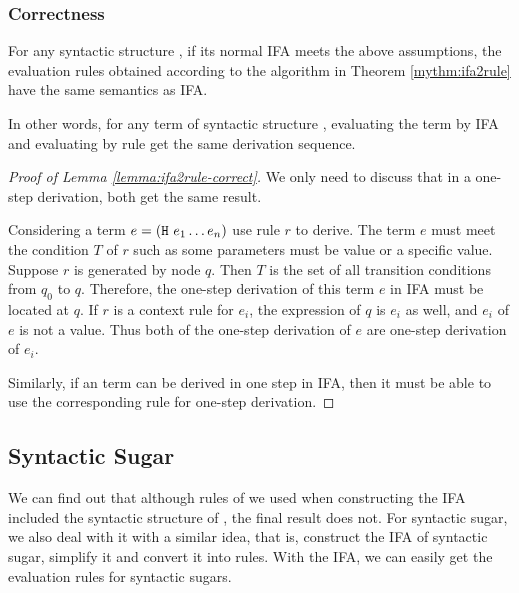 \subsubsection{Correctness}

\begin{lemma}
\label{lemma:ifa2rule-correct}
For any syntactic structure , if its normal IFA meets the above assumptions, the evaluation rules obtained according to the algorithm in Theorem \ref{mythm:ifa2rule} have the same semantics as IFA. 
\end{lemma}

In other words, for any term of syntactic structure , evaluating the term by IFA and evaluating by rule get the same derivation sequence.

\begin{proof}[Proof of Lemma \ref{lemma:ifa2rule-correct}]
We only need to discuss that in a one-step derivation, both get the same result.

Considering a term $e=(\mbox{\tt H}~e_1 \ldots e_n)$ use rule $r$ to derive. The term $e$ must meet the condition $T$ of $r$ such as some parameters must be value or a specific value. Suppose $r$ is generated by node $q$. Then $T$ is the set of all transition conditions from $q_0$ to $q$. Therefore, the one-step derivation of this term $e$ in IFA must be located at $q$. If $r$ is a context rule for $e_i$, the expression of $q$ is $e_i$ as well, and $e_i$ of $e$ is not a value. Thus both of the one-step derivation of $e$ are one-step derivation of $e_i$.

Similarly, if an term can be derived in one step in IFA, then it must be able to use the corresponding rule for one-step derivation.

\end{proof}

\subsection{Syntactic Sugar}

We can find out that although rules of  we used when constructing the IFA included the syntactic structure of , the final result does not. For syntactic sugar, we also deal with it with a similar idea, that is, construct the IFA of syntactic sugar, simplify it and convert it into rules. With the IFA, we can easily get the evaluation rules for syntactic sugars.

